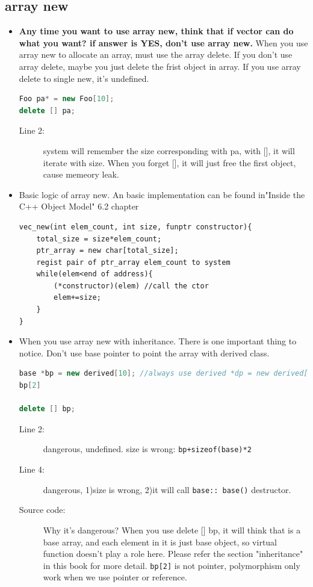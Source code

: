 \documentclass[a4paper,11pt,twoside]{book}
\begin{document}
\subsection{array new}
\begin{itemize}
	\item \textbf{Any time you want to use array new, think that if vector can do what you want? if answer is YES, don't use array new.} When you use array new to allocate an array, must use the array delete. If you don't use array delete, maybe you just delete the frist object in array. If you use array delete to single new, it's undefined. 
\begin{lstlisting}[frame=single, language=c++]
Foo pa* = new Foo[10];
delete [] pa;
\end{lstlisting}

\begin{description}
	\item[Line 2:] system will remember the size corresponding with pa,  with [], it will iterate with size.  When you forget [], it will just free the first object, cause memeory leak.
\end{description}

	\item Basic logic of array new. An basic implementation can be found in"Inside the C++ Object Model" 6.2 chapter
\begin{lstlisting}[numbers=none]
vec_new(int elem_count, int size, funptr constructor){
	total_size = size*elem_count;
	ptr_array = new char[total_size];
	regist pair of ptr_array elem_count to system
	while(elem<end of address){
		(*constructor)(elem) //call the ctor
		elem+=size;
	}
}
\end{lstlisting}
	
	\item When you use array new with inheritance. There is one important thing to notice. Don't use base pointer to point the array with derived class. 
\begin{lstlisting}[frame=single, language=c++]
base *bp = new derived[10]; //always use derived *dp = new derived[10]
bp[2] 
	
delete [] bp;
\end{lstlisting}
\begin{description}
	\item[Line 2:] dangerous, undefined. size is wrong: \texttt{bp+sizeof(base)*2}
	\item[Line 4:] dangerous, 1)size is wrong, 2)it will call \texttt{base::~base()} destructor. 
	
	\item[Source code:] Why it's dangerous? When you use delete [] bp, it will think that is a base array, and each element in it is just base object, so virtual function doesn't play a role here. Please refer the section "inheritance" in this book for more detail. \texttt{bp[2]} is not pointer, polymorphism only work when we use pointer or reference.
\end{description}

\end{itemize}
\end{document}

